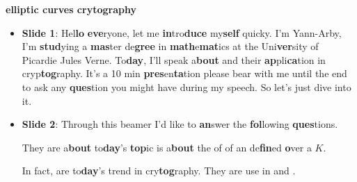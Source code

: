 \begin{center}
    \textbf{el\textbf{lip}tic curves cry\textbf{tog}raphy}
\end{center}
\begin{itemize}
    \item \textbf{Slide 1}: Hel\textbf{lo} \textbf{eve}ryone, let me \textbf{in}tro\textbf{duce}
        my\textbf{self} quicky. I'm
        Yann-Arby, I'm \textbf{stud}ying a \textbf{mas}ter de\textbf{gree} in
        \textbf{math}e\textbf{mat}ics at the Uni\textbf{ver}sity of Picardie Jules
        Verne. To\textbf{day}, I'll speak a\textbf{bout}  and their
        \textbf{ap}pli\textbf{ca}tion in cryp\textbf{tog}raphy. It's a 10 min
        \textbf{pres}en\textbf{ta}tion
         please bear with
        me until the end to ask any \textbf{ques}tion you might have during my speech.
        So let's just
        dive into it.
    \item \textbf{Slide 2}: Through this beamer I'd like to \textbf{an}swer the
        \textbf{fol}lowing \textbf{ques}tions.

        They are a\textbf{bout} to\textbf{day}'s \textbf{top}ic  is a\textbf{bout} the  of
         of
            an  de\textbf{fin}ed \textbf{o}ver a  $K$. 

            In fact,  are to\textbf{day}'s
            trend in cry\textbf{tog}raphy. They are  use in
             and . 


\end{itemize}
